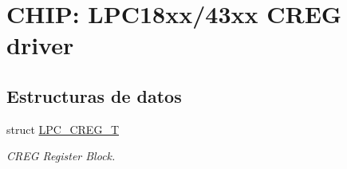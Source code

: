 \hypertarget{group___c_r_e_g__18_x_x__43_x_x}{}\section{C\+H\+IP\+: L\+P\+C18xx/43xx C\+R\+EG driver}
\label{group___c_r_e_g__18_x_x__43_x_x}
\subsection*{Estructuras de datos}
\begin{DoxyCompactItemize}
\item 
struct \hyperlink{struct_l_p_c___c_r_e_g___t}{L\+P\+C\+\_\+\+C\+R\+E\+G\+\_\+T}
\begin{DoxyCompactList}\small\item\em C\+R\+EG Register Block. \end{DoxyCompactList}\end{DoxyCompactItemize}
